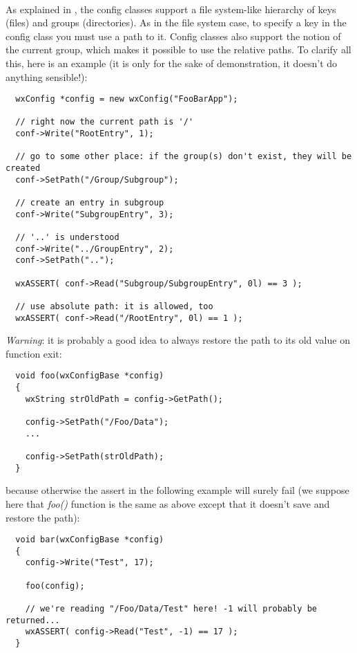 
\\


As explained in , the config classes
support a file system-like hierarchy of keys (files) and groups (directories).
As in the file system case, to specify a key in the config class you must use
a path to it. Config classes also support the notion of the current group,
which makes it possible to use the relative paths. To clarify all this, here
is an example (it is only for the sake of demonstration, it doesn't do anything
sensible!):

\begin{verbatim}
  wxConfig *config = new wxConfig("FooBarApp");

  // right now the current path is '/'
  conf->Write("RootEntry", 1);

  // go to some other place: if the group(s) don't exist, they will be created
  conf->SetPath("/Group/Subgroup");

  // create an entry in subgroup
  conf->Write("SubgroupEntry", 3);

  // '..' is understood
  conf->Write("../GroupEntry", 2);
  conf->SetPath("..");

  wxASSERT( conf->Read("Subgroup/SubgroupEntry", 0l) == 3 );

  // use absolute path: it is allowed, too
  wxASSERT( conf->Read("/RootEntry", 0l) == 1 );
\end{verbatim}

{\it Warning}: it is probably a good idea to always restore the path to its
old value on function exit:

\begin{verbatim}
  void foo(wxConfigBase *config)
  {
    wxString strOldPath = config->GetPath();

    config->SetPath("/Foo/Data");
    ...

    config->SetPath(strOldPath);
  }
\end{verbatim}

because otherwise the assert in the following example will surely fail
(we suppose here that {\it foo()} function is the same as above except that it
doesn't save and restore the path):

\begin{verbatim}
  void bar(wxConfigBase *config)
  {
    config->Write("Test", 17);

    foo(config);

    // we're reading "/Foo/Data/Test" here! -1 will probably be returned...
    wxASSERT( config->Read("Test", -1) == 17 );
  }
\end{verbatim}

